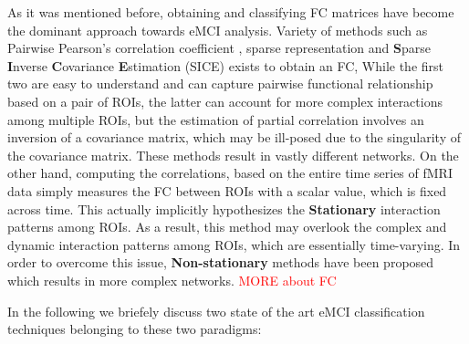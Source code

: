 \documentclass[preprint,12pt]{elsarticle}
\begin{document}
%	
As it was mentioned before, obtaining and classifying FC matrices have become the dominant approach towards eMCI analysis. 
Variety of methods such as Pairwise Pearson’s correlation coefficient \cite{r10, r11}, sparse representation \cite{r10, r12, r13}  and \textbf{S}parse \textbf{I}nverse \textbf{C}ovariance \textbf{E}stimation (SICE)\cite{r15} exists to obtain an FC,
While the first two are easy to understand and can capture pairwise functional relationship based on a pair of ROIs, the latter can account for more complex interactions among multiple ROIs, but the estimation of partial correlation involves an inversion of a covariance matrix, which may be ill-posed due to the singularity of the covariance matrix. 
These methods result in vastly different networks\cite{r35}. On the other hand, computing the correlations, based on the entire time series of fMRI data simply measures the FC between ROIs with a scalar value, which is fixed across time. This actually implicitly hypothesizes the \textbf{Stationary} interaction patterns among ROIs. As a result, this method may overlook the complex and dynamic interaction patterns among ROIs, which are essentially time-varying. In order to overcome this issue, \textbf{Non-stationary} methods have been proposed which results in more complex networks\cite{r16}\textendash \cite{r19}. \textcolor{red}{MORE about FC}


In the following we briefely discuss two state of the art eMCI classification techniques belonging to these two paradigms:
\end{document}
